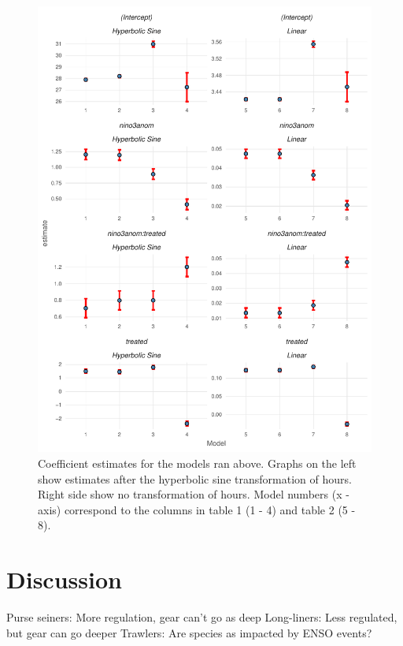 \documentclass[11pt]{article}
\begin{document}


\clearpage

\begin{figure}
\centering
\includegraphics{img/unnamed-chunk-13-1.pdf}
\caption{Coefficient estimates for the models ran above. Graphs on the
left show estimates after the hyperbolic sine transformation of hours.
Right side show no transformation of hours. Model numbers (x - axis)
correspond to the columns in table 1 (1 - 4) and table 2 (5 - 8).}
\end{figure}

\section{Discussion}

Purse seiners: More regulation, gear can't go as deep
Long-liners: Less regulated, but gear can go deeper 
Trawlers: Are species as impacted by ENSO events?
\end{document}
